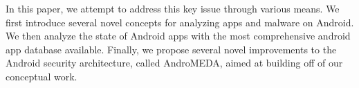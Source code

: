 In this paper, we attempt to address this key issue through various means. We first introduce several novel concepts for analyzing apps and malware on Android. We then analyze the state of Android apps with the most comprehensive android app database available. Finally, we propose several novel improvements to the Android security architecture, called AndroMEDA, aimed at building off of our conceptual work.

